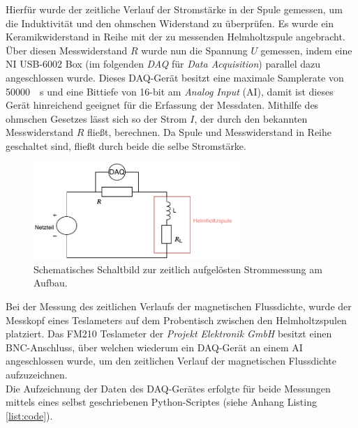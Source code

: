 \documentclass[page,pdftex,12pt,a4paper,twoside,openright]{scrbook}
\begin{document}
Hierfür wurde der zeitliche Verlauf der Stromstärke in der Spule gemessen, um die Induktivität und den ohmschen Widerstand zu überprüfen. Es wurde ein Keramikwiderstand in Reihe mit der zu messenden Helmholtzspule angebracht. Über diesen Messwiderstand \(R\) wurde nun die Spannung \(U\) gemessen, indem eine NI USB-6002 Box (im folgenden \emph{DAQ} für \emph{Data Acquisition}) parallel dazu angeschlossen wurde. Dieses DAQ-Gerät besitzt eine maximale Samplerate von \SI{50000}{\per\s} und eine Bittiefe von 16-bit am \emph{Analog Input} (AI), damit ist dieses Gerät hinreichend geeignet für die Erfassung der Messdaten. Mithilfe des ohmschen Gesetzes lässt sich so der Strom \(I\), der durch den bekannten Messwiderstand \(R\) fließt, berechnen. Da Spule und Messwiderstand in Reihe geschaltet sind, fließt durch beide die selbe Stromstärke.\\

\begin{figure}[h]
\centering
\includegraphics[width=0.7\textwidth]{img/strommessung.pdf}
\caption{\label{fig-strommessung-aufbau}
Schematisches Schaltbild zur zeitlich aufgelösten Strommessung am Aufbau.}
\end{figure}

Bei der Messung des zeitlichen Verlaufs der magnetischen Flussdichte, wurde der \mbox{Messkopf} eines Teslameters auf dem Probentisch zwischen den Helmholtzspulen platziert. Das FM210 Teslameter der \emph{Projekt Elektronik GmbH} besitzt einen BNC-Anschluss, über welchen wiederum ein DAQ-Gerät an einem AI angeschlossen wurde, um den zeitlichen Verlauf der magnetischen Flussdichte aufzuzeichnen.\\

Die Aufzeichnung der Daten des DAQ-Gerätes erfolgte für beide Messungen mittels eines selbst geschriebenen Python-Scriptes (siehe Anhang Listing \ref{list:code}).\\
\end{document}
